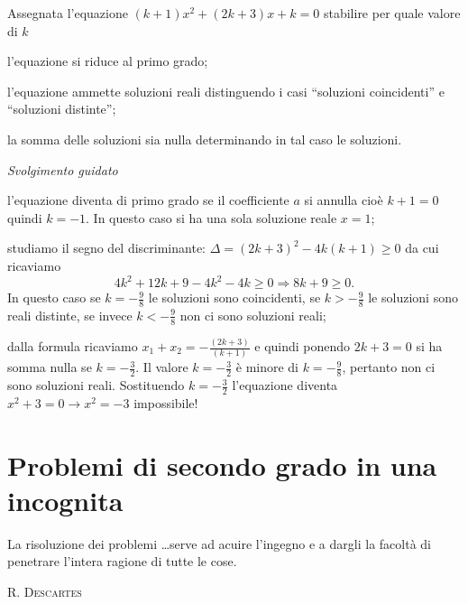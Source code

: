 \begin{exrig}
\begin{esempio}
Assegnata l’equazione $( k + 1 ) x^{2} + ( 2 k + 3 ) x + k = 0$ stabilire per quale valore di $k$
\begin{enumeratea}
\item l’equazione si riduce al primo grado;
\item l’equazione ammette soluzioni reali distinguendo i casi “soluzioni coincidenti” e “soluzioni distinte”;
\item la somma delle soluzioni sia nulla determinando in tal caso le soluzioni.
\end{enumeratea}
\emph{Svolgimento guidato}
\begin{enumeratea}
\item l’equazione diventa di primo grado se il coefficiente $a$ si annulla cioè $k + 1 = 0$ quindi $k = - 1$. In questo caso si ha una sola soluzione reale $ x=1 $;
\item studiamo il segno del discriminante: $\Delta = ( 2 k + 3 )^{2} - 4 k ( k + 1 ) \geq 0$ da cui ricaviamo 
\[4 k^{2} + 12 k + 9 - 4 k^{2} - 4 k \geq 0 \Rightarrow 8 k + 9 \geq 0.\] 
In questo caso se $k = - \frac{9}{8}$ le soluzioni sono coincidenti, se $k > - \frac{9}{8}$ le soluzioni sono reali distinte, se invece $ k<-\frac{9}{8} $ non ci sono soluzioni reali;
\item dalla formula ricaviamo $x_{1} + x_{2} = - \frac{( 2 k + 3 )}{( k + 1 )}$ e quindi ponendo $2 k + 3 = 0$ si ha somma nulla se $k = - \frac{3}{2}$. Il valore $k = - \frac{3}{2}$ è minore di $k = - \frac{9}{8}$, pertanto non ci sono soluzioni reali. Sostituendo $k = - \frac{3}{2}$ l'equazione diventa $ x^2+3=0 \to x^2=-3$ impossibile!
\end{enumeratea}
\end{esempio}
\end{exrig}
\vspazio\ovalbox{\risolvii \ref{ese:3.91}, \ref{ese:3.92}, \ref{ese:3.93}, \ref{ese:3.94}, \ref{ese:3.95}, \ref{ese:3.96}, \ref{ese:3.97}, \ref{ese:3.98}, \ref{ese:3.99}, \ref{ese:3.100}, \ref{ese:3.101}, \ref{ese:3.102},}

\vspazio{}

\section{Problemi di secondo grado in una incognita}
 \epigraph{La risoluzione dei problemi \ldots serve ad acuire l'ingegno e a dargli la facoltà di penetrare
 l'intera ragione di tutte le cose.}{{\scshape{R. Descartes}}}

